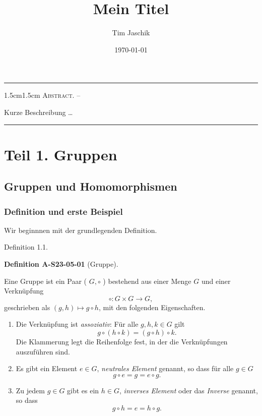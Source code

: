 \documentclass[10pt, letterpaper]{article}
\title{Mein Titel}
\author{Tim Jaschik}
\date{\today}
\renewenvironment{abstract}
  {
    \begin{adjustwidth}{1.5cm}{1.5cm}
    \small
    \textsc{Abstract. –}%
  }
  {
    \end{adjustwidth}
  }
\newcommand{\CustomHeading}[3]{%
  \par\medskip\noindent%
  \textbf{#1 #2} \textnormal{(#3)}.\enskip%
}
\newenvironment{DEF}[2]{\begin{unitbox}\CustomHeading{Definition}{#1}{#2}}{\end{unitbox}}
\begin{document}
\maketitle
\rule{\textwidth}{0.5pt}
\begin{abstract}
Kurze Beschreibung …
\end{abstract}
\rule{\textwidth}{0.5pt}
\vspace{0.5cm}




\tableofcontents

\pagebreak


\section{Teil 1. Gruppen}


\subsection{Gruppen und Homomorphismen}


\subsubsection{Definition und erste Beispiel}


Wir beginnnen mit der grundlegenden Definition.

Definition 1.1. 


\begin{DEF}{A-S23-05-01}{Gruppe}
Eine Gruppe ist ein Paar ( $G, \circ$ ) bestehend aus einer Menge $G$ und einer Verknüpfung
$$
\circ: G \times G \rightarrow G,
$$
geschrieben als $(g, h) \mapsto g \circ h$, mit den folgenden Eigenschaften.
\begin{enumerate}
  \item Die Verknüpfung ist \emph{assoziativ}: Für alle $g, h, k \in G$ gilt
  \[
    g \circ (h \circ k) = (g \circ h) \circ k.
  \]
  Die Klammerung legt die Reihenfolge fest, in der die Verknüpfungen auszuführen sind.

  \item Es gibt ein Element $e \in G$, \emph{neutrales Element} genannt, so dass für alle $g \in G$
  \[
    g \circ e = g = e \circ g.
  \]

  \item Zu jedem $g \in G$ gibt es ein $h \in G$, \emph{inverses Element} oder das \emph{Inverse} genannt, so dass
  \[
    g \circ h = e = h \circ g.
  \]
\end{enumerate}
\end{DEF}
\end{document}
